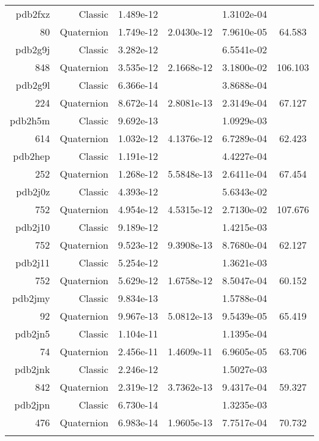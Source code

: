 \begin{xltabular}{\textwidth}{r|rS[table-format=1.3e+2]S[table-format=1.4e+2]S[table-format=1.4e+2]S[table-format=-1.3]}
pdb2fxz & Classic & 1.489e-12 &  & 1.3102e-04 & \\
80 & Quaternion & 1.749e-12 & 2.0430e-12 & 7.9610e-05 & 64.583\\  \addlinespace
pdb2g9j & Classic & 3.282e-12 &  & 6.5541e-02 & \\
848 & Quaternion & 3.535e-12 & 2.1668e-12 & 3.1800e-02 & 106.103\\  \addlinespace
pdb2g9l & Classic & 6.366e-14 &  & 3.8688e-04 & \\
224 & Quaternion & 8.672e-14 & 2.8081e-13 & 2.3149e-04 & 67.127\\  \addlinespace
pdb2h5m & Classic & 9.692e-13 &  & 1.0929e-03 & \\
614 & Quaternion & 1.032e-12 & 4.1376e-12 & 6.7289e-04 & 62.423\\  \addlinespace
pdb2hep & Classic & 1.191e-12 &  & 4.4227e-04 & \\
252 & Quaternion & 1.268e-12 & 5.5848e-13 & 2.6411e-04 & 67.454\\  \addlinespace
pdb2j0z & Classic & 4.393e-12 &  & 5.6343e-02 & \\
752 & Quaternion & 4.954e-12 & 4.5315e-12 & 2.7130e-02 & 107.676\\  \addlinespace
pdb2j10 & Classic & 9.189e-12 &  & 1.4215e-03 & \\
752 & Quaternion & 9.523e-12 & 9.3908e-13 & 8.7680e-04 & 62.127\\  \addlinespace
pdb2j11 & Classic & 5.254e-12 &  & 1.3621e-03 & \\
752 & Quaternion & 5.629e-12 & 1.6758e-12 & 8.5047e-04 & 60.152\\  \addlinespace
pdb2jmy & Classic & 9.834e-13 &  & 1.5788e-04 & \\
92 & Quaternion & 9.967e-13 & 5.0812e-13 & 9.5439e-05 & 65.419\\  \addlinespace
pdb2jn5 & Classic & 1.104e-11 &  & 1.1395e-04 & \\
74 & Quaternion & 2.456e-11 & 1.4609e-11 & 6.9605e-05 & 63.706\\  \addlinespace
pdb2jnk & Classic & 2.246e-12 &  & 1.5027e-03 & \\
842 & Quaternion & 2.319e-12 & 3.7362e-13 & 9.4317e-04 & 59.327\\  \addlinespace
pdb2jpn & Classic & 6.730e-14 &  & 1.3235e-03 & \\
476 & Quaternion & 6.983e-14 & 1.9605e-13 & 7.7517e-04 & 70.732\\  \addlinespace

\end{xltabular}
